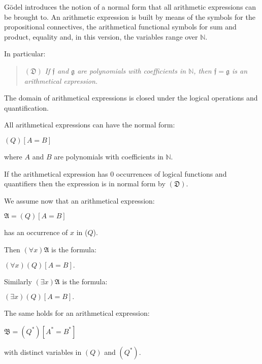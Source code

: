 \documentclass[12pt]{article}
\begin{document}
G\"{o}del introduces the notion of a normal form that all arithmetic expressions can be brought to. An arithmetic expression is built by means of the symbols for the propositional connectives, the arithmetical functional symbols for sum and product, equality and, in this version, the variables range over $\mathbb{N}$. 

In particular: 

\begin{quote}
$(\mathfrak{D})$ \quad \emph{If $\mathfrak{f}$ and $\mathfrak{g}$ are polynomials with coefficients in $\mathbb{N}$, then $\mathfrak{f} = \mathfrak{g}$ is an arithmetical expression.}
\end{quote}

The domain of arithmetical expressions is closed under the logical operations and quantification.

All arithmetical expressions can have the normal form:

\begin{center}
$(Q) [A = B]$
\end{center}

where $A$ and $B$ are polynomials with coefficients in $\mathbb{N}$.

If the arithmetical expression has $0$ occurrences of logical functions and quantifiers then the expression is in normal form by $(\mathfrak{D}).$

We assume now that an arithmetical expression:

\begin{center} 
$\mathfrak{A} = (Q) [A = B]$
\end{center}

has an occurrence of $x$ in ($Q$).

Then $(\forall x) \mathfrak{A}$ is the formula:

\begin{center}
$(\forall x) (Q) [A = B].$
\end{center}

Similarly $(\exists x) \mathfrak{A}$ is the formula:

\begin{center}
$(\exists x) (Q) [A = B].$
\end{center}

The same holds for an arithmetical expression:

\begin{center}
$\mathfrak{B} = (Q^*) [A^* = B^*]$ 
\end{center}

with distinct variables in $(Q)$ and $(Q^*).$
\end{document}
